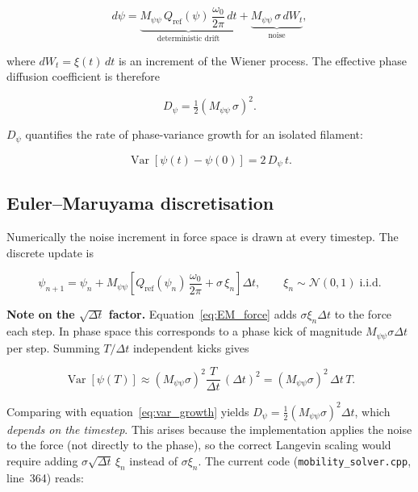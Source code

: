 \documentclass[11pt,a4paper]{article}
\newcommand{\DT}{\Delta t}
\begin{document}
\begin{equation}
  d\psi = \underbrace{M_{\psi\psi}\,Q_{\text{ref}}(\psi)\,
    \frac{\omega_0}{2\pi}\,dt}_{\text{deterministic drift}}
  + \underbrace{M_{\psi\psi}\,\sigma\,dW_t}_{\text{noise}},
\end{equation}

where $dW_t = \xi(t)\,dt$ is an increment of the Wiener process.  The
effective phase diffusion coefficient is therefore

\begin{equation}
  \boxed{D_{\psi} = \tfrac{1}{2}(M_{\psi\psi}\,\sigma)^2.}
  \label{eq:Deff}
\end{equation}

$D_\psi$ quantifies the rate of phase-variance growth for an isolated
filament:

\begin{equation}
  \operatorname{Var}[\psi(t) - \psi(0)] = 2\,D_\psi\,t.
  \label{eq:var_growth}
\end{equation}

\subsection{Euler--Maruyama discretisation}

Numerically the noise increment in force space is drawn at every timestep.
The discrete update is

\begin{equation}
  \psi_{n+1} = \psi_n + M_{\psi\psi}\!\left[Q_{\text{ref}}(\psi_n)\,
    \frac{\omega_0}{2\pi} + \sigma\,\xi_n\right]\DT,
  \qquad \xi_n \sim \mathcal{N}(0,1)\;\text{i.i.d.}
  \label{eq:EM_force}
\end{equation}

\textbf{Note on the $\sqrt{\DT}$ factor.}
Equation~\eqref{eq:EM_force} adds $\sigma\xi_n\DT$ to the force each step.
In phase space this corresponds to a phase kick of magnitude
$M_{\psi\psi}\sigma\DT$ per step.  Summing $T/\DT$ independent kicks gives

\begin{equation}
  \operatorname{Var}[\psi(T)] \approx
    (M_{\psi\psi}\sigma)^2 \frac{T}{\DT}\,(\DT)^2
  = (M_{\psi\psi}\sigma)^2\,\DT\,T.
\end{equation}

Comparing with equation~\eqref{eq:var_growth} yields $D_\psi = \tfrac{1}{2}
(M_{\psi\psi}\sigma)^2\DT$, which \emph{depends on the timestep}.  This
arises because the implementation applies the noise to the force (not directly
to the phase), so the correct Langevin scaling would require adding
$\sigma\sqrt{\DT}\,\xi_n$ instead of $\sigma\xi_n$.  The current code
(\texttt{mobility\_solver.cpp}, line~364) reads:
\end{document}
